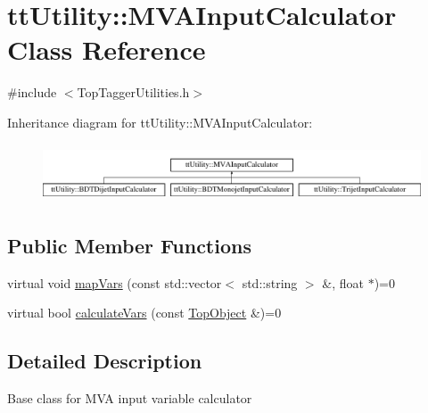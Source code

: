 \hypertarget{classttUtility_1_1MVAInputCalculator}{\section{tt\-Utility\-:\-:M\-V\-A\-Input\-Calculator Class Reference}
\label{classttUtility_1_1MVAInputCalculator}
}


{\ttfamily \#include $<$Top\-Tagger\-Utilities.\-h$>$}

Inheritance diagram for tt\-Utility\-:\-:M\-V\-A\-Input\-Calculator\-:\begin{figure}[H]
\begin{center}
\leavevmode
\includegraphics[height=1.728395cm]{classttUtility_1_1MVAInputCalculator}
\end{center}
\end{figure}
\subsection*{Public Member Functions}
\begin{DoxyCompactItemize}
\item 
virtual void \hyperlink{classttUtility_1_1MVAInputCalculator_a9fd6fa53268079fa590b86ee9791c344}{map\-Vars} (const std\-::vector$<$ std\-::string $>$ \&, float $\ast$)=0
\item 
virtual bool \hyperlink{classttUtility_1_1MVAInputCalculator_ac48dbe37b01a207150537c86e9f85038}{calculate\-Vars} (const \hyperlink{classTopObject}{Top\-Object} \&)=0
\end{DoxyCompactItemize}


\subsection{Detailed Description}
Base class for M\-V\-A input variable calculator 

